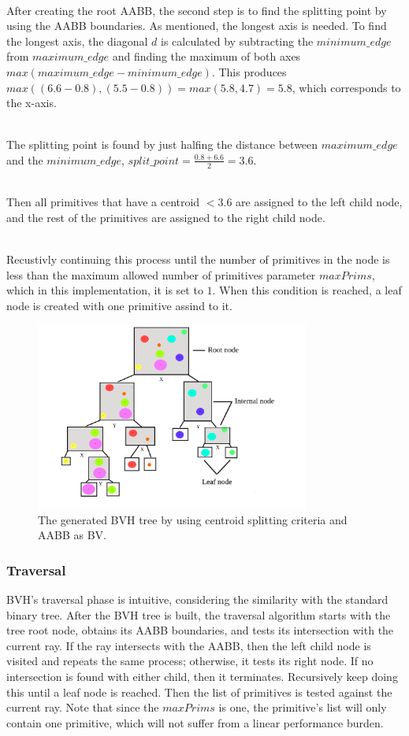 \documentclass[11pt,a4paper]{article}
\begin{document}
\noindent
\\
After creating the root AABB, the second step is to find the splitting point by using the AABB boundaries. As mentioned, the longest axis is needed. To find the longest axis, the diagonal $d$ is calculated by subtracting the $minimum\_edge$ from $maximum\_edge $ and finding the maximum of both axes $max(maximum\_edge - minimum\_edge)$. This produces $max((6.6-0.8) , (5.5-0.8)) = max(5.8,4.7) = 5.8$, which corresponds to the x-axis. 

\noindent
\\
The splitting point is found by just halfing the distance between $maximum\_edge $ and the $minimum\_edge$, $split\_point = \frac{0.8+6.6}{2} = 3.6$.

\noindent
\\
Then all primitives that have a centroid $ < 3.6$ are assigned to the left child node, and the rest of the primitives are assigned to the right child node.  

\noindent
\\
Recustivly continuing this process until the number of primitives in the node is less than the maximum allowed number of primitives parameter $maxPrims$, which in this implementation, it is set to $1$. When this condition is reached, a leaf node is created with one primitive assind to it. 


\begin{figure}[h]	
     \centering
     \captionsetup{justification=centering,margin=2cm}
     \includegraphics[width=9cm]{images/example_bvh/tree.png}
     \caption{The generated BVH tree by using centroid splitting criteria and AABB as BV.}
     \label{fig:dice}
\end{figure}

\subsubsection{Traversal}
BVH's traversal phase is intuitive, considering the similarity with the standard binary tree. After the BVH tree is built, the traversal algorithm starts with the tree root node, obtains its AABB boundaries, and tests its intersection with the current ray. If the ray intersects with the AABB, then the left child node is visited and repeats the same process; otherwise, it tests its right node. If no intersection is found with either child, then it terminates. Recursively keep doing this until a leaf node is reached. Then the list of primitives is tested against the current ray. Note that since the $maxPrims$ is one, the primitive's list will only contain one primitive, which will not suffer from a linear performance burden. 
\end{document}
